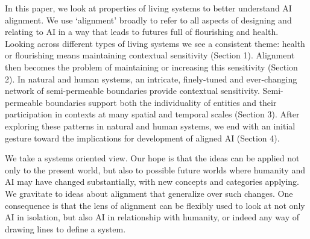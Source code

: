\documentclass[12pt]{article}
\begin{document}







In this paper, we look at properties of living systems to better understand AI alignment. We use `alignment' broadly to refer to all aspects of designing and relating to AI in a way that leads to futures full of flourishing and health. Looking across different types of living systems we see a consistent theme: health or flourishing means maintaining contextual sensitivity (Section 1). Alignment then becomes the problem of maintaining or increasing this sensitivity (Section 2). In natural and human systems, an intricate, finely-tuned and ever-changing network of semi-permeable boundaries provide contextual sensitivity. Semi-permeable boundaries support both the individuality of entities and their participation in contexts at many spatial and temporal scales (Section 3). After exploring these patterns in natural and human systems, we end with an initial gesture toward the implications for development of aligned AI (Section 4).



We take a systems oriented view. Our hope is that the ideas can be applied not only to the present world, but also to possible future worlds where humanity and AI may have changed substantially, with new concepts and categories applying. We gravitate to ideas about alignment that generalize over such changes. One consequence is that the lens of alignment can be flexibly used to look at not only AI in isolation, but also AI in relationship with humanity, or indeed any way of drawing lines to define a system.
\end{document}
